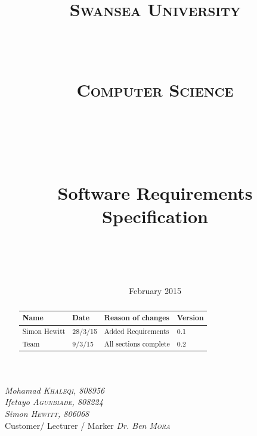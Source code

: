 \documentclass[a4paper,10pt]{article}
\title{	
\normalfont \normalsize 
\begin{LARGE} \textsc{Swansea University} \end{LARGE} \\ [15pt] %
\begin{large} \textsc{Computer Science} \end{large} \\ [15pt] %
\vspace{50px}
\horrule{0.5pt} \\[0.4cm] %
\begin{Huge}Software Requirements Specification \end{Huge}%
\horrule{2pt} \\[0.5cm] %
}
\author{} %
\date{} %
\begin{document}
\begin{titlepage}
\maketitle
\vspace{50px}
\begin{flushleft}
  \textit{Mohamad \textsc{Khaleqi}, 808956} \\
  \textit{Ifetayo \textsc{Agunbiade}, 808224} \\
 \textit{Simon \textsc{Hewitt}, 806068} \\
  \hfill Customer/ Lecturer / Marker \textit{Dr. Ben \textsc{Mora}}
\end{flushleft}
\vfill
\center \date{\normalsize February 2015} %

\end{titlepage}
\pagebreak


\tableofcontents
\pagebreak
\justify


\renewcommand{\abstractname}{Revision History}
\begin{abstract}
\begin{center}
  \begin{tabular}{ |  p{3cm} | p{3cm} |  p{5cm} | p{2cm} |}
    \hline
    Name & Date & Reason of changes & Version \\ \hline \hline
    Simon Hewitt & 28/3/15 & Added Requirements & 0.1 \\ \hline 
    Team & 9/3/15 & All sections complete & 0.2 \\
    \hline
  \end{tabular}
\end{center}
\end{abstract}
\end{document}
